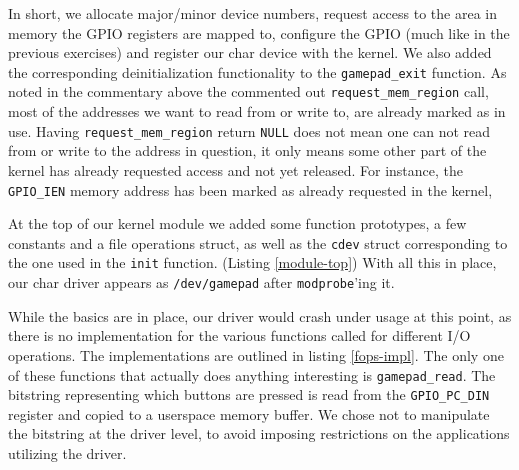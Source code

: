 In short, we allocate major/minor device numbers, request access to the area in memory the GPIO registers are mapped to, configure the GPIO (much like in the previous exercises) and register our char device with the kernel.
We also added the corresponding deinitialization functionality to the \texttt{gamepad\_exit} function.
As noted in the commentary above the commented out \texttt{request\_mem\_region} call, most of the addresses we want to read from or write to, are already marked as in use. Having \texttt{request\_mem\_region} return \texttt{NULL} does not mean one can not read from or write to the address in question, it only means some other part of the kernel has already requested access and not yet released. For instance, the \texttt{GPIO\_IEN} memory address has been marked as already requested in the kernel, 

At the top of our kernel module we added some function prototypes, a few constants and a file operations struct, as well as the \texttt{cdev} struct corresponding to the one used in the \texttt{init} function. (Listing \ref{module-top})
With all this in place, our char driver appears as \texttt{/dev/gamepad} after \texttt{modprobe}'ing it.


While the basics are in place, our driver would crash under usage at this point, as there is no implementation for the various functions called for different I/O operations. The implementations are outlined in listing \ref{fops-impl}. The only one of these functions that actually does anything interesting is \texttt{gamepad\_read}. The bitstring representing which buttons are pressed is read from the \texttt{GPIO\_PC\_DIN} register and copied to a userspace memory buffer. We chose not to manipulate the bitstring at the driver level, to avoid imposing restrictions on the applications utilizing the driver.

